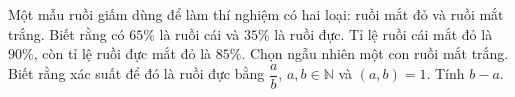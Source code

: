 \begin{ex}
Một mẫu ruồi giấm dùng để làm thí nghiệm có hai loại: ruồi mắt đỏ và ruồi mắt trắng. Biết rằng có $65\%$ là ruồi cái và $35\%$ là ruồi đực. Tỉ lệ ruồi cái mắt đỏ là $90\%$, còn tỉ lệ ruồi đực mắt đỏ là $85\%$. Chọn ngẫu nhiên một con ruồi mắt trắng. Biết rằng xác suất để đó là ruồi đực bằng $\dfrac ab$, $a,b\in\mathbb N$ và $(a,b)=1$. Tính $b-a$.
\end{ex}
